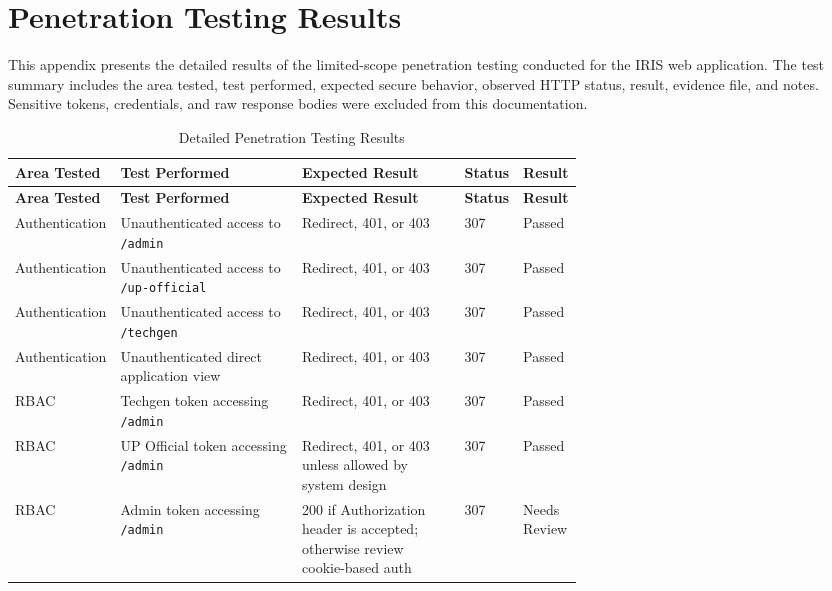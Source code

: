 \chapter{Penetration Testing Results}
\label{app:penetration-testing-summary}

This appendix presents the detailed results of the limited-scope penetration testing conducted for the IRIS web application. The test summary includes the area tested, test performed, expected secure behavior, observed HTTP status, result, evidence file, and notes. Sensitive tokens, credentials, and raw response bodies were excluded from this documentation.

\begin{landscape}
\small
\setlength{\tabcolsep}{4pt}
\renewcommand{\arraystretch}{1.1}

\begin{xltabular}{\linewidth}{p{0.18\linewidth} p{0.32\linewidth} X p{0.07\linewidth} p{0.09\linewidth}}
\caption{Detailed Penetration Testing Results}
\label{tab:detailed-penetration-testing-results}\\
\hline
\textbf{Area Tested} & \textbf{Test Performed} & \textbf{Expected Result} & \textbf{Status} & \textbf{Result} \\
\hline
\endfirsthead

\hline
\textbf{Area Tested} & \textbf{Test Performed} & \textbf{Expected Result} & \textbf{Status} & \textbf{Result} \\
\hline
\endhead

\hline
\endfoot

Authentication & Unauthenticated access to \texttt{/admin} & Redirect, 401, or 403 & 307 & Passed \\
Authentication & Unauthenticated access to \texttt{/up-official} & Redirect, 401, or 403 & 307 & Passed \\
Authentication & Unauthenticated access to \texttt{/techgen} & Redirect, 401, or 403 & 307 & Passed \\
Authentication & Unauthenticated direct application view & Redirect, 401, or 403 & 307 & Passed \\

RBAC & Techgen token accessing \texttt{/admin} & Redirect, 401, or 403 & 307 & Passed \\
RBAC & UP Official token accessing \texttt{/admin} & Redirect, 401, or 403 unless allowed by system design & 307 & Passed \\
RBAC & Admin token accessing \texttt{/admin} & 200 if Authorization header is accepted; otherwise review cookie-based auth & 307 & Needs Review \\


\end{xltabular}
\end{landscape}
